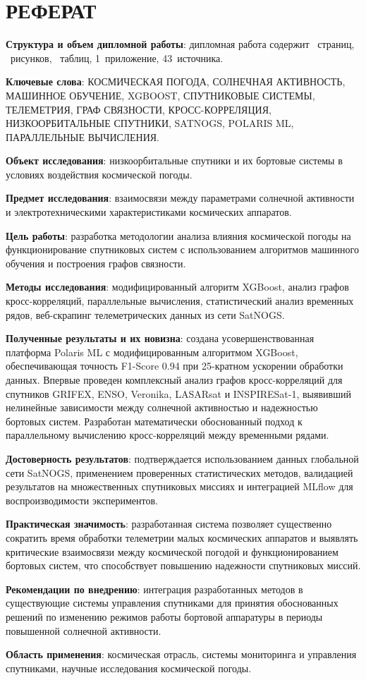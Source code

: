 \chapter*{РЕФЕРАТ}

\textbf{Структура и объем дипломной работы}: дипломная работа содержит \pageref{LastPage}~страниц, \totalfigures~рисунков, \totaltables~таблиц, 1~приложение, 43~источника.

\textbf{Ключевые слова}: КОСМИЧЕСКАЯ ПОГОДА, СОЛНЕЧНАЯ АКТИВНОСТЬ, МАШИННОЕ ОБУЧЕНИЕ, XGBOOST, СПУТНИКОВЫЕ СИСТЕМЫ, ТЕЛЕМЕТРИЯ, ГРАФ СВЯЗНОСТИ, КРОСС-КОРРЕЛЯЦИЯ, НИЗКООРБИТАЛЬНЫЕ СПУТНИКИ, SATNOGS, POLARIS ML, ПАРАЛЛЕЛЬНЫЕ ВЫЧИСЛЕНИЯ.

\textbf{Объект исследования}: низкоорбитальные спутники и их бортовые системы в условиях воздействия космической погоды.

\textbf{Предмет исследования}: взаимосвязи между параметрами солнечной активности и электротехническими характеристиками космических аппаратов.

\textbf{Цель работы}: разработка методологии анализа влияния космической погоды на функционирование спутниковых систем с использованием алгоритмов машинного обучения и построения графов связности.

\textbf{Методы исследования}: модифицированный алгоритм XGBoost, анализ графов кросс-корреляций, параллельные вычисления, статистический анализ временных рядов, веб-скрапинг телеметрических данных из сети SatNOGS.

\textbf{Полученные результаты и их новизна}: создана усовершенствованная платформа Polaris ML с модифицированным алгоритмом XGBoost, обеспечивающая точность F1-Score 0.94 при 25-кратном ускорении обработки данных. Впервые проведен комплексный анализ графов кросс-корреляций для спутников GRIFEX, ENSO, Veronika, LASARsat и INSPIRESat-1, выявивший нелинейные зависимости между солнечной активностью и надежностью бортовых систем. Разработан математически обоснованный подход к параллельному вычислению кросс-корреляций между временными рядами.

\textbf{Достоверность результатов}: подтверждается использованием данных глобальной сети SatNOGS, применением проверенных статистических методов, валидацией результатов на множественных спутниковых миссиях и интеграцией MLflow для воспроизводимости экспериментов.

\textbf{Практическая значимость}: разработанная система позволяет существенно сократить время обработки телеметрии малых космических аппаратов и выявлять критические взаимосвязи между космической погодой и функционированием бортовых систем, что способствует повышению надежности спутниковых миссий.

\textbf{Рекомендации по внедрению}: интеграция разработанных методов в существующие системы управления спутниками для принятия обоснованных решений по изменению режимов работы бортовой аппаратуры в периоды повышенной солнечной активности.

\textbf{Область применения}: космическая отрасль, системы мониторинга и управления спутниками, научные исследования космической погоды.
